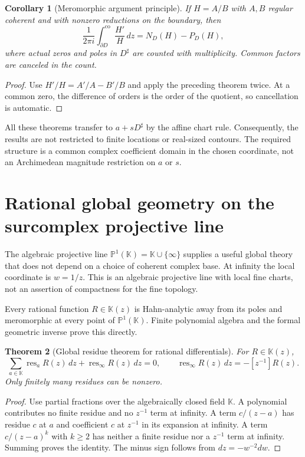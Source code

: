 \documentclass[11pt,a4paper]{article}
\numberwithin{equation}{section}
\newtheorem{theorem}{Theorem}[section]
\newtheorem{corollary}[theorem]{Corollary}
\theoremstyle{definition}
\theoremstyle{remark}
\newcommand{\K}{\mathbb K}
\newcommand{\res}{\operatorname{res}}
\newcommand{\co}{\mathrm{co}}
\begin{document}
\begin{corollary}[Meromorphic argument principle]
If $H=A/B$ with $A,B$ regular coherent and with nonzero reductions on the boundary, then
\[
 \frac1{2\pi i}\int_{\partial D}^{\co}\frac{H'}H\,dz
 =N_D(H)-P_D(H),
\]
where actual zeros and poles in $D^\sharp$ are counted with multiplicity. Common factors are canceled in the count.
\end{corollary}
\begin{proof}
Use $H'/H=A'/A-B'/B$ and apply the preceding theorem twice. At a common zero, the difference of orders is the order of the quotient, so cancellation is automatic.
\end{proof}

All these theorems transfer to $a+sD^\sharp$ by the affine chart rule. Consequently, the results are not restricted to finite locations or real-sized contours. The required structure is a common complex coefficient domain in the chosen coordinate, not an Archimedean magnitude restriction on $a$ or $s$.

\section{Rational global geometry on the surcomplex projective line}
\label{sec:rational}
The algebraic projective line $\mathbb P^1(\K)=\K\cup\{\infty\}$ supplies a useful global theory that does not depend on a choice of coherent complex base. At infinity the local coordinate is $w=1/z$. This is an algebraic projective line with local fine charts, not an assertion of compactness for the fine topology.

Every rational function $R\in\K(z)$ is Hahn-analytic away from its poles and meromorphic at every point of $\mathbb P^1(\K)$. Finite polynomial algebra and the formal geometric inverse prove this directly.

\begin{theorem}[Global residue theorem for rational differentials]
\label{thm:rationalres}
For $R\in\K(z)$,
\[
 \sum_{a\in\K}\res_a R(z)\,dz+\res_\infty R(z)\,dz=0,
 \qquad
 \res_\infty R(z)\,dz=-[z^{-1}]R(z).
\]
Only finitely many residues can be nonzero.
\end{theorem}
\begin{proof}
Use partial fractions over the algebraically closed field $\K$. A polynomial contributes no finite residue and no $z^{-1}$ term at infinity. A term $c/(z-a)$ has residue $c$ at $a$ and coefficient $c$ at $z^{-1}$ in its expansion at infinity. A term $c/(z-a)^k$ with $k\geq2$ has neither a finite residue nor a $z^{-1}$ term at infinity. Summing proves the identity. The minus sign follows from $dz=-w^{-2}dw$.
\end{proof}
\end{document}
